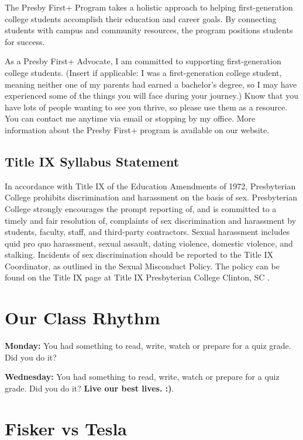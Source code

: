 \documentclass[
]{book}
\begin{document}
The Presby First+ Program takes a holistic approach to helping first-generation college students accomplish their education and career goals. By connecting students with campus and community resources, the program positions students for success.

As a Presby First+ Advocate, I am committed to supporting first-generation college students. (Insert if applicable: I was a first-generation college student, meaning neither one of my parents had earned a bachelor's degree, so I may have experienced some of the things you will face during your journey.) Know that you have lots of people wanting to see you thrive, so please use them as a resource. You can contact me anytime via email or stopping by my office. More information about the Presby First+ program is available on our website.

\hypertarget{title-ix-syllabus-statement}{%
\section{Title IX Syllabus Statement}\label{title-ix-syllabus-statement}}

In accordance with Title IX of the Education Amendments of 1972, Presbyterian College prohibits discrimination and harassment on the basis of sex. Presbyterian College strongly encourages the prompt reporting of, and is committed to a timely and fair resolution of, complaints of sex discrimination and harassment by students, faculty, staff, and third-party contractors. Sexual harassment includes quid pro quo harassment, sexual assault, dating violence, domestic violence, and stalking. Incidents of sex discrimination should be reported to the Title IX Coordinator, as outlined in the Sexual Misconduct Policy. The policy can be found on the Title IX page at Title IX \textbar{} Presbyterian College \textbar{} Clinton, SC .

\hypertarget{our-class-rhythm}{%
\chapter{Our Class Rhythm}\label{our-class-rhythm}}

\textbf{Monday:} You had something to read, write, watch or prepare for a quiz grade. Did you do it?

\textbf{Wednesday:} You had something to read, write, watch or prepare for a quiz grade. Did you do it? \textbf{Live our best lives. :)}.

\hypertarget{fisker-vs-tesla}{%
\chapter{Fisker vs Tesla}\label{fisker-vs-tesla}}
\end{document}
